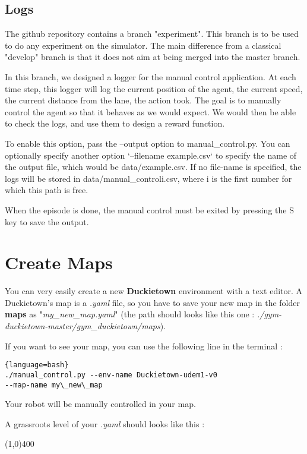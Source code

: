 \subsection{Logs}
The github repository contains a branch "experiment".
This branch is to be used to do any experiment on the simulator.
The main difference from a classical "develop" branch is that it does not aim at being merged into the master branch.

In this branch, we designed a logger for the manual control application.
At each time step, this logger will log the current position of the agent, the current speed, the current distance from the lane, the action took.
The goal is to manually control the agent so that it behaves as we would expect.
We would then be able to check the logs, and use them to design a reward function.

To enable this option, pass the --output option to manual\_control.py.
You can optionally specify another option `--filename example.csv` to specify the name of the output file, which would be data/example.csv.
If no file-name is specified, the logs will be stored in data/manual\_controli.csv, where i is the first number for which this path is free.

When the episode is done, the manual control must be exited by pressing the S key to save the output.


\section{Create Maps}
You can very easily create a new \textbf{Duckietown} environment with a text editor.
A Duckietown's map is a \textit{.yaml} file, so you have to save your new map in the folder \textbf{maps} as "\textit{my\_new\_map.yaml}" (the path should looks like this one : \textit{./gym-duckietown-master/gym\_duckietown/maps}).

If you want to see your map, you can use the following line in the terminal :

\begin{lstlisting}{language=bash}
./manual_control.py --env-name Duckietown-udem1-v0
--map-name my\_new\_map
\end{lstlisting}


\noindent Your robot will be manually controlled in your map.


\noindent A grassroots level of your \textit{.yaml} should looks like this :

\begin{center}
    \line(1,0){400}
\end{center}

